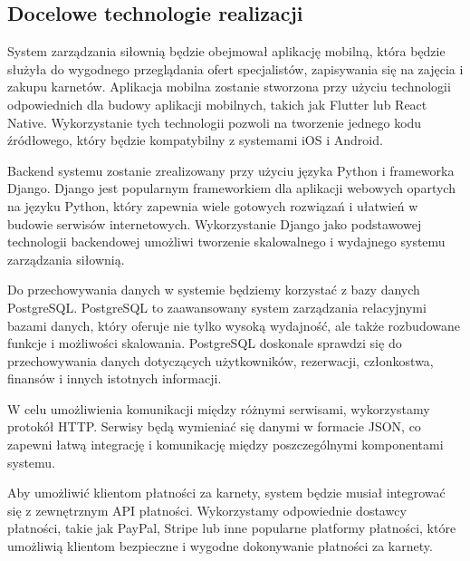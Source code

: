 \subsection{Docelowe technologie realizacji}\label{subsec:tech-real}

{System zarządzania siłownią będzie obejmował aplikację mobilną, która będzie służyła do wygodnego przeglądania ofert specjalistów, zapisywania się na zajęcia i zakupu karnetów. Aplikacja mobilna zostanie stworzona przy użyciu technologii odpowiednich dla budowy aplikacji mobilnych, takich jak Flutter lub React Native. Wykorzystanie tych technologii pozwoli na tworzenie jednego kodu źródłowego, który będzie kompatybilny z systemami iOS i Android.}

{Backend systemu zostanie zrealizowany przy użyciu języka Python i frameworka Django. Django jest popularnym frameworkiem dla aplikacji webowych opartych na języku Python, który zapewnia wiele gotowych rozwiązań i ułatwień w budowie serwisów internetowych. Wykorzystanie Django jako podstawowej technologii backendowej umożliwi tworzenie skalowalnego i wydajnego systemu zarządzania siłownią.}

{Do przechowywania danych w systemie będziemy korzystać z bazy danych PostgreSQL. PostgreSQL to zaawansowany system zarządzania relacyjnymi bazami danych, który oferuje nie tylko wysoką wydajność, ale także rozbudowane funkcje i możliwości skalowania. PostgreSQL doskonale sprawdzi się do przechowywania danych dotyczących użytkowników, rezerwacji, członkostwa, finansów i innych istotnych informacji.}

{W celu umożliwienia komunikacji między różnymi serwisami, wykorzystamy protokół HTTP. Serwisy będą wymieniać się danymi w formacie JSON, co zapewni łatwą integrację i komunikację między poszczególnymi komponentami systemu.}

{Aby umożliwić klientom płatności za karnety, system będzie musiał integrować się z zewnętrznym API płatności. Wykorzystamy odpowiednie dostawcy płatności, takie jak PayPal, Stripe lub inne popularne platformy płatności, które umożliwią klientom bezpieczne i wygodne dokonywanie płatności za karnety.}
